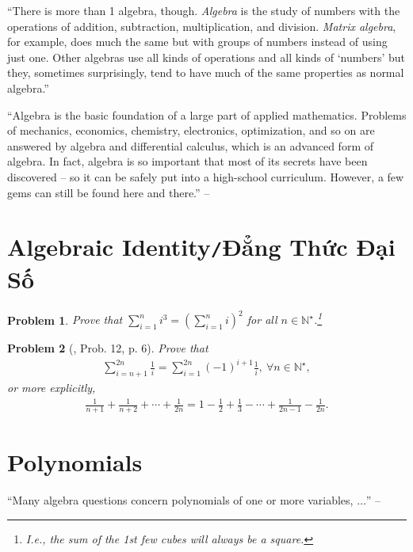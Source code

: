 \documentclass[oneside]{book}
\numberwithin{equation}{section}
\newtheorem{problem}{Problem}[section]
\begin{document}
``There is more than 1 algebra, though. \textit{Algebra} is the study of numbers with the operations of addition, subtraction, multiplication, and division. \textit{Matrix algebra}, for example, does much the same but with groups of numbers instead of using just one. Other algebras use all kinds of operations and all kinds of `numbers' but they, sometimes surprisingly, tend to have much of the same properties as normal algebra.''

``Algebra is the basic foundation of a large part of applied mathematics. Problems of mechanics, economics, chemistry, electronics, optimization, and so on are answered by algebra and differential calculus, which is an advanced form of algebra. In fact, algebra is so important that most of its secrets have been discovered -- so it can be safely put into a high-school curriculum. However, a few gems can still be found here and there.'' -- \cite[Chap. 3, p. 35]{Tao2006}

\section{Algebraic Identity\texttt{/}Đẳng Thức Đại Số}
\begin{problem}
	Prove that $\sum_{i=1}^n i^3 = \left(\sum_{i=1}^n i\right)^2$ for all $n\in\mathbb{N}^\star$.\footnote{I.e., the sum of the 1st few cubes will always be a square.}
\end{problem}

\begin{problem}[\cite{Gelca_Andreescu2017}, Prob. 12, p. 6] Prove that
	\begin{align*}
		\sum_{i=n+1}^{2n} \frac{1}{i} = \sum_{i=1}^{2n} (-1)^{i+1}\frac{1}{i},\ \forall n\in\mathbb{N}^\star,
	\end{align*}
	or more explicitly,
	\begin{align*}
		\frac{1}{n + 1} + \frac{1}{n + 2} + \cdots + \frac{1}{2n} = 1 - \frac{1}{2} + \frac{1}{3} - \cdots + \frac{1}{2n - 1} - \frac{1}{2n}.
	\end{align*}
\end{problem}

\section{Polynomials}
``Many algebra questions concern polynomials of one or more variables, $\ldots$'' -- \cite[p. 41]{Tao2006}
\end{document}
